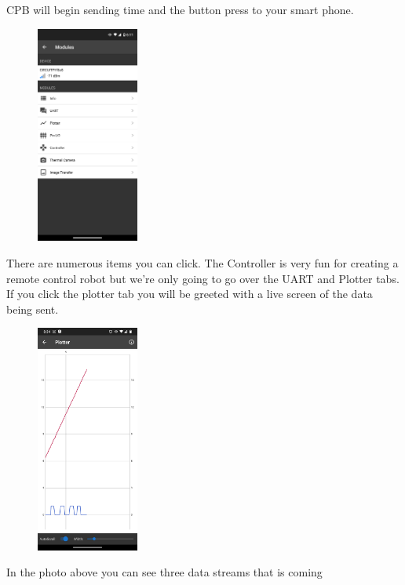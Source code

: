 CPB will begin sending time and the button press to your smart phone. 
\begin{figure}[H]
  \begin{center}
    \includegraphics[width=0.3\textwidth]{Figures/phoneapp2.png}
  \end{center}
\end{figure}
There are numerous items you can click. The Controller is very fun for
creating a remote control robot but we're only going to go over the
UART and Plotter tabs. If you click the plotter tab you will be
greeted with a live screen of the data being sent. 
\begin{figure}[H]
  \begin{center}
    \includegraphics[width=0.3\textwidth]{Figures/phoneapp3.png}
  \end{center}
\end{figure}
In the photo above you can see three data streams that is coming

